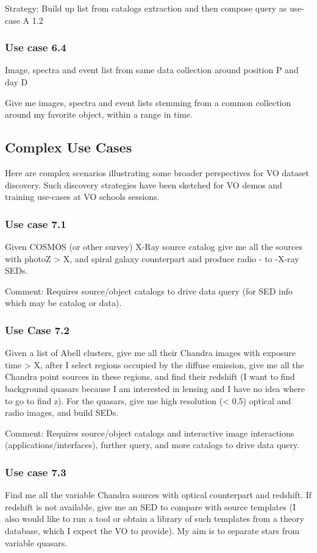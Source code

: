 \documentclass[11pt,a4paper]{ivoa}
\begin{document}
Strategy: Build up list from catalogs extraction and then compose query as use-case A 1.2

\subsubsection{Use case 6.4}
Image, spectra and event list from same data collection around position P and day D 

Give me images, spectra and event lists stemming from a common collection around my favorite object, within a range in
time.  

\subsection{Complex Use Cases}
Here are complex scenarios illustrating some broader perspectives for VO dataset discovery. Such discovery strategies
have been sketched for VO demos and training use-cases at VO schools sessions.  

\subsubsection{Use case 7.1}
Given COSMOS (or other survey) X-Ray source catalog give me all the sources with photoZ {\textgreater} X, and spiral
galaxy counterpart and produce radio - to -X-ray SEDs.

Comment: Requires source/object catalogs to drive data query (for SED info which may be catalog or data).

\subsubsection{Use Case 7.2}
Given a list of Abell clusters, give me all their Chandra images with exposure time {\textgreater} X, after I select
regions occupied by the diffuse emission, give me all the Chandra point sources in these regions, and find their
redshift (I want to find background quasars because I am interested in lensing and I have no idea where to go to find
z). For the quasars, give me high resolution ({\textless} 0.5{\textquotedbl}) optical and radio images, and build SEDs.

Comment: Requires source/object catalogs and interactive image interactions (applications/interfaces), further query,
and more catalogs to drive data query.

\subsubsection{Use case 7.3}
Find me all the variable Chandra sources with optical counterpart and redshift. If redshift is not available, give me an
SED to compare with source templates (I also would like to run a tool or obtain a library of such templates from a
theory database, which I expect the VO to provide). My aim is to separate stars from variable quasars.
\end{document}
